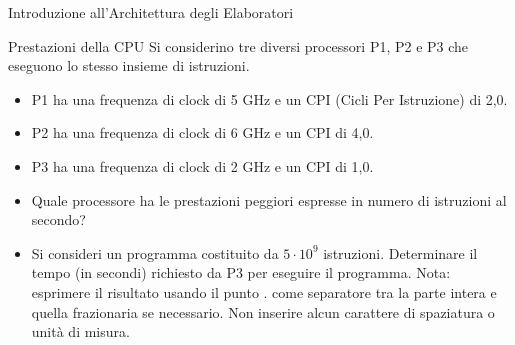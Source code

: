 \documentclass[11pt]{article}
\begin{document}
\begin{quiz}{Introduzione all'Architettura degli Elaboratori}
\begin{cloze}[points=1,shuffle=false]{Prestazioni della CPU}
    Si considerino tre diversi processori P1, P2 e P3 che eseguono lo stesso insieme di istruzioni. 
    \begin{itemize}
        \item P1 ha una frequenza di clock di 5 GHz e un CPI (Cicli Per Istruzione) di 2,0. 
        \item P2 ha una frequenza di clock di 6 GHz e un CPI di 4,0.
        \item P3 ha una frequenza di clock di 2 GHz e un CPI di 1,0.
    \end{itemize}
    \begin{itemize}
    \item Quale processore ha le prestazioni peggiori espresse in numero di istruzioni al secondo? 
    \item Si consideri un programma costituito da $5\cdot10^9$ istruzioni. Determinare il tempo (in secondi) richiesto da P3 per eseguire il programma.     
    Nota: esprimere il risultato usando il punto . come separatore tra la parte intera e quella frazionaria se necessario. Non inserire alcun carattere di spaziatura o unità di misura.
    \end{itemize}
\end{cloze}


\end{quiz}
\end{document}
